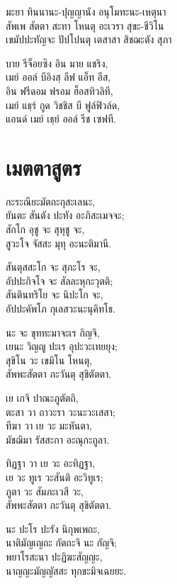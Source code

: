มะยา ทินนานะ-ปุญญานัง อนุโมทะนะ-เหตุนา\\
สัพเพ สัตตา สะทา โหนตุ อะเวรา สุขะ-ชีวิโน\\
เขมัปปะทัญจะ ปัปโปนตุ เตสาสา สิชฌะตัง สุภา\\

\begin{english}
บาย รีจ็อยซิง อิน มาย แชริง,\\
เมย์ ออล์ บีอิงสฺ ลีฟ แอ็ท อีส,\\
อิน ฟรีดอม ฟรอม ฮ็อสทิวลิที,\\
เมย์ แธฺร์ กูด วิชชิส บี ฟูล์ฟิวล์ด,\\
แอนด์ เมย์ เธฺย์ ออล์ รีช เซฟที.\\
\end{english}
\clearpage


\chapter[เมตตา]{เมตตาสูตร}


กะระณียะมัตถะกุสะเลนะ,\\
ยันตะ สันตัง ปะทัง อะภิสะเมจจะ;\\
สักโก อุชู จะ สุหุชู จะ,\\
สูวะโจ จัสสะ มุทุ อะนะติมานี.

สันตุสสะโก จะ สุภะโร จะ,\\
อัปปะกิจโจ จะ สัลละหุกะวุตติ;\\
สันตินทริโย จะ นิปะโก จะ,\\
อัปปะคัพโภ กุเลสวะนะนุคิทโธ.

นะ จะ ขุททะมาจะเร กิญจิ,\\
เยนะ วิญญู ปะเร อุปะวะเทยยุง;\\
สุขิโน วะ เขมิโน โหนตุ,\\
สัพพะสัตตา ภะวันตุ สุขิตัตตา.

เย เกจิ ปาณะภูตัตถิ,\\
ตะสา วา ถาวะรา วะนะวะเสสา;\\
ทีฆา วา เย วะ มะหันตา,\\
มัชฌิมา รัสสะกา อะณุกะถูลา.

ทิฏฐา วา เย วะ อะทิฏฐา,\\
เย วะ ทูเร วะสันติ อะวิทูเร;\\
ภูตา วะ สัมภะเวสี วะ,\\
สัพพะสัตตา ภะวันตุ สุขิตัตตา.

นะ ปะโร ปะรัง นิกุพเพถะ,\\
นาติมัญเญถะ กัตถะจิ นะ กัญจิ;\\
พยาโรสะนา ปะฏิฆะสัญญะ,\\
นาญญะมัญญัสสะ ทุกขะมิจเฉยยะ.


